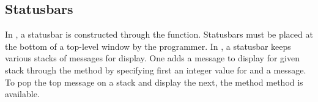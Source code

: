






\subsection{Statusbars}
\label{sec:RGtk2:statusbars}

In \GTK, a statusbar is constructed through the
 function. Statusbars must be placed at the
bottom of a top-level window by the programmer. In \GTK, a statusbar
keeps various stacks of messages for display. One adds a message to
display for given stack through the  method
by specifying first an integer value for  and a
message. To pop the top message on a stack and display the next, the
method  method is available.


